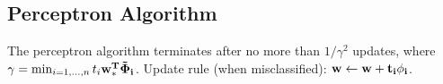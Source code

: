 \documentclass[9pt]{scrartcl}
\begin{document}
\begin{multicols}{4}
\section{Perceptron Algorithm}
The perceptron algorithm terminates after no more than $1/\gamma^2$
updates, where $\gamma = \min_{i=1,\dots,n} t_i\bf w_*^T\bf \tilde
\Phi_i$. Update rule (when misclassified): $\bf w \leftarrow \bf w + t_i\bf\phi_i$.

\end{multicols}
\end{document}
